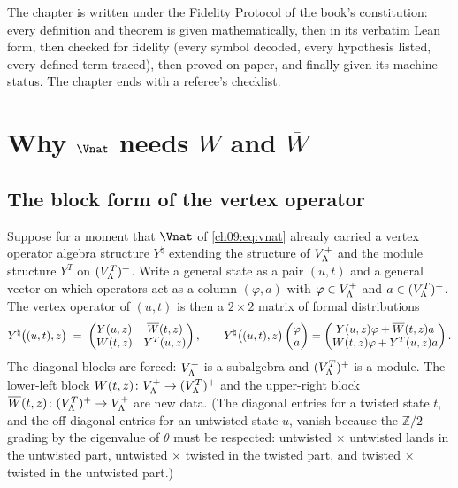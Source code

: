 The chapter is written under the Fidelity Protocol of the book's constitution: every definition
and theorem is given mathematically, then in its verbatim Lean form, then checked for fidelity
(every symbol decoded, every hypothesis listed, every defined term traced), then proved on
paper, and finally given its machine status. The chapter ends with a referee's checklist.

\section{Why \texorpdfstring{$\Vnat$}{V-natural} needs \texorpdfstring{$W$}{W} and \texorpdfstring{$\overline{W}$}{Wbar}}\label{ch09:sec:why}

\subsection{The block form of the vertex operator}

Suppose for a moment that $\Vnat$ of \eqref{ch09:eq:vnat} already carried a vertex operator
algebra structure $Y^\natural$ extending the structure of $V_{\Lambda}^{+}$ and the module structure
$Y^T$ on $(V_{\Lambda}^{T})^{+}$. Write a general state as a pair $(u,t)$ and a general vector on which
operators act as a column $(\varphi,a)$ with $\varphi\in V_{\Lambda}^{+}$ and $a\in(V_{\Lambda}^{T})^{+}$. The
vertex operator of $(u,t)$ is then a $2\times 2$ matrix of formal distributions
\begin{equation}\label{ch09:eq:block}
  Y^\natural\big((u,t),z\big) \;=\;
  \begin{pmatrix} Y(u,z) & \overline{W}(t,z) \\ W(t,z) & Y^T(u,z)\end{pmatrix},
  \qquad
  Y^\natural\big((u,t),z\big)\begin{pmatrix}\varphi\\ a\end{pmatrix}
  =\begin{pmatrix} Y(u,z)\varphi + \overline{W}(t,z)a\\ W(t,z)\varphi + Y^T(u,z)a\end{pmatrix}.
\end{equation}
The diagonal blocks are forced: $V_{\Lambda}^{+}$ is a subalgebra and $(V_{\Lambda}^{T})^{+}$ is a module. The
lower-left block $W(t,z)\colon V_{\Lambda}^{+}\to(V_{\Lambda}^{T})^{+}$ and the upper-right block
$\overline{W}(t,z)\colon(V_{\Lambda}^{T})^{+}\to V_{\Lambda}^{+}$ are new data. (The diagonal entries for a twisted
state $t$, and the off-diagonal entries for an untwisted state $u$, vanish because the
$\mathbb{Z}/2$-grading by the eigenvalue of $\theta$ must be respected: untwisted $\times$
untwisted lands in the untwisted part, untwisted $\times$ twisted in the twisted part, and twisted
$\times$ twisted in the untwisted part.)

